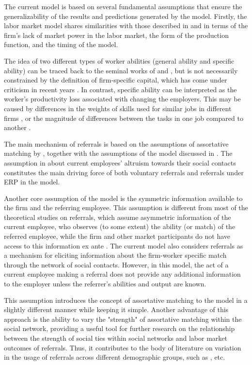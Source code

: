 \documentclass[12pt]{article}
\begin{document}
The current model is based on several fundamental assumptions that ensure the generalizability of the results and predictions generated by the model. Firstly, the labor market model shares similarities with those described in \cite{gibbons1999theory} and \cite{ekinci2016employee} in terms of the firm's lack of market power in the labor market, the form of the production function, and the timing of the model. 

The idea of two different types of worker abilities (general ability and specific ability) can be traced back to the seminal works of \cite{becker1962investment, becker1975investment} and \cite{jovanovic1979job}, but is not necessarily constrained by the definition of firm-specific capital, which has come under criticism in recent years  \citep{gibbons2004task, gathmann2010general}. In contrast, specific ability can be interpreted as the worker's productivity loss associated with changing the employers. This may be caused by differences in the weights of skills used for similar jobs in different firms \citep{lazear2009firm}, or the magnitude of differences between the tasks in one job compared to another \citep{gibbons2004task}. 

The main mechanism of referrals is based on the assumptions of assortative matching by \cite{montgomery1991social}, together with the assumptions of the model discussed in \cite{friebel2023employee}. The assumption in \cite{friebel2023employee} about current employees' altruism towards their social contacts constitutes the main driving force of both voluntary referrals and referrals under ERP in the model. 

Another core assumption of the model is the symmetric information available to the firm and the referring employee. This assumption is different from most of the theoretical studies on referrals, which assume asymmetric information of the current employee, who observes (to some extent) the ability (or match) of the referred employee, while the firm and other market participants do not have access to this information ex ante \citep{saloner1985old, beaman2012gets, ekinci2016employee}. The current model also considers referrals as a mechanism for eliciting information about the firm-worker specific match through the network of social contacts. However, in this model, the act of a current employee making a referral does not provide any additional information to the employer unless the referrer's abilities and output are known.

This assumption introduces the concept of assortative matching to the model in a slightly different manner while keeping it simple. Another advantage of this approach is the ability to vary the "strength" of assortative matching within the social network, providing a useful tool for further research on the relationship between the strength of social ties within social networks and labor market outcomes of referrals. Thus, it contributes to the body of literature on variation in the usage of referrals across different demographic groups, such as \cite{montgomery1994weak, granovetter1995getting, calvo2004effects, kuzubas2009endogenous, lester2021heterogeneous}, etc.
\end{document}
